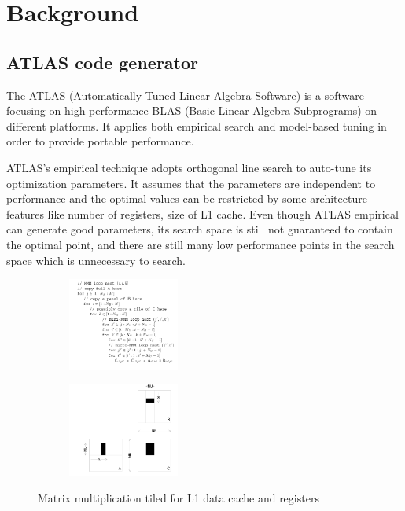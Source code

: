 \section{Background}
\label{sec:background}

  \subsection{ATLAS code generator}
  \label{sec:atlas_intro}
  The ATLAS (Automatically Tuned Linear Algebra Software) is a software focusing on high performance 
  BLAS (Basic Linear Algebra Subprograms) on different platforms. It applies both empirical search and model-based 
  tuning in order to provide portable performance. \par
  ATLAS's empirical technique adopts orthogonal line search to auto-tune its optimization parameters.
  It assumes that the parameters are independent to performance and the optimal values can be
  restricted by some architecture features like number of registers, size of L1 cache.
  Even though ATLAS empirical can generate good parameters, its search space is still not guaranteed to contain
  the optimal point, and there are still many low performance points in the search space which is unnecessary
  to search.

  \begin{figure}
  \centering
  \begin{subfigure}{1.0\linewidth}
    \includegraphics[width=0.4\textwidth]{images/ATLAS_code.png}
    \caption{}
  \end{subfigure}
  \begin{subfigure}[t]{1.0\linewidth}
    \includegraphics[width=0.4\textwidth]{images/ATLAS_pic.png}
    \caption{}
  \end{subfigure}
  \caption{Matrix multiplication tiled for L1 data cache and registers}
  \label{fig:design}
\end{figure}



